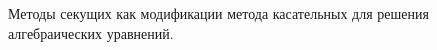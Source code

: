 \documentclass[__main__.tex]{subfiles}
\begin{document}
Методы секущих как модификации метода касательных для решения алгебраических уравнений.
\end{document}

